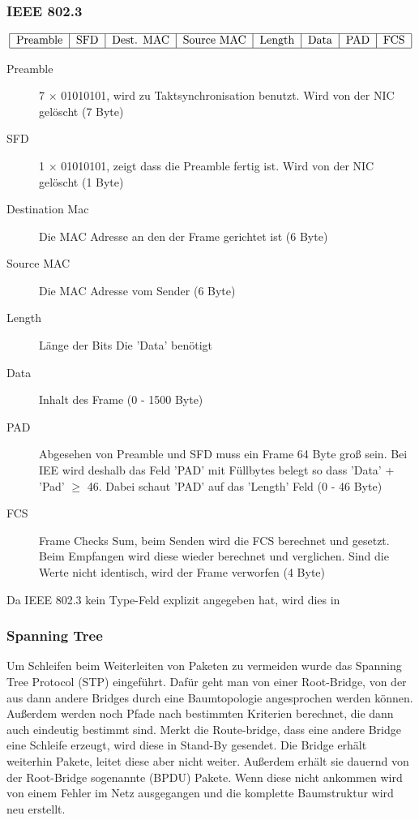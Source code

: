 \documentclass[a4paper,10pt]{scrartcl}
\begin{document}
        \subsubsection{IEEE 802.3}
            \[
                \begin{tabular}{|c|c|c|c|c|c|c|c|c|}
                    \hline
                        Preamble & SFD & Dest. MAC & Source MAC & Length & Data & PAD & FCS \\
                    \hline
                \end{tabular}
            \]
            \begin{description}
                \item[Preamble] 7 $\times$ 01010101, wird zu Taktsynchronisation benutzt. Wird von der NIC gelöscht (7 Byte)
                \item[SFD] 1 $\times$ 01010101, zeigt dass die Preamble fertig ist. Wird von der NIC gelöscht (1 Byte)
                \item[Destination Mac] Die MAC Adresse an den der Frame gerichtet ist (6 Byte) 
                \item[Source MAC] Die MAC Adresse vom Sender (6 Byte)
                \item[Length] Länge der Bits Die 'Data' benötigt
                \item[Data] Inhalt des Frame (0 - 1500 Byte)
                \item[PAD] Abgesehen von Preamble und SFD muss ein Frame 64 Byte groß sein. Bei IEE wird deshalb das Feld 'PAD' mit Füllbytes belegt so dass 'Data' + 'Pad' $\geq$ 46.
                Dabei schaut 'PAD' auf das 'Length' Feld (0 - 46 Byte)
                \item[FCS] Frame Checks Sum, beim Senden wird die FCS berechnet und gesetzt. Beim Empfangen wird diese wieder berechnet und verglichen. Sind die Werte nicht identisch, wird der Frame verworfen (4 Byte) 
            \end{description}
            Da IEEE 802.3 kein Type-Feld explizit angegeben hat, wird dies in 
        \subsubsection{Spanning Tree}
            Um Schleifen beim Weiterleiten von Paketen zu vermeiden wurde das Spanning Tree Protocol (STP) eingeführt. Dafür geht man von einer Root-Bridge, von der aus dann andere Bridges
            durch eine Baumtopologie angesprochen werden können. Außerdem werden noch Pfade nach bestimmten Kriterien berechnet, die dann auch eindeutig bestimmt sind. Merkt die Route-bridge, dass eine
            andere Bridge eine Schleife erzeugt, wird diese in Stand-By gesendet. Die Bridge erhält weiterhin Pakete, leitet diese aber nicht weiter. Außerdem erhält sie dauernd von der Root-Bridge sogenannte 
            (BPDU) Pakete. Wenn diese nicht ankommen wird von einem Fehler im Netz ausgegangen und die komplette Baumstruktur wird neu erstellt.
\end{document}
